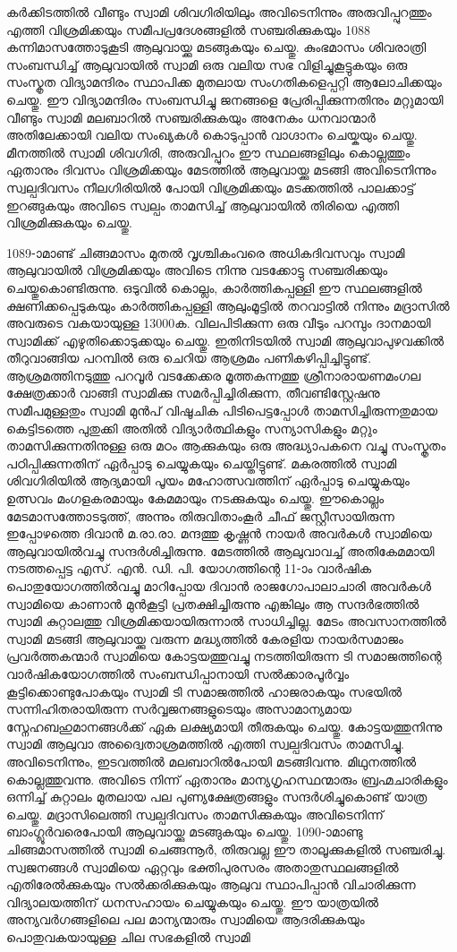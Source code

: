 \documentclass[12pt,openany]{book}
\begin{document}
	കർക്കിടത്തിൽ വീണ്ടും സ്വാമി ശിവഗിരിയിലും അവിടെനിന്നും അരുവിപ്പുറത്തും എത്തി വിശ്രമിക്കയും സമീപപ്രദേശങ്ങളിൽ സഞ്ചരിക്കുകയും 1088 കന്നിമാസത്തോടുകൂടി ആലുവായ്ക്കു മടങ്ങുകയും ചെയ്തു. കുംഭമാസം ശിവരാത്രി സംബന്ധിച്ച് ആലുവായിൽ സ്വാമി ഒരു വലിയ സഭ വിളിച്ചുകൂട്ടുകയും ഒരു സംസ്കൃത വിദ്യാമന്ദിരം സ്ഥാപിക്ക മുതലായ സംഗതികളെപ്പറ്റി ആലോചിക്കയും ചെയ്തു. ഈ വിദ്യാമന്ദിരം സംബന്ധിച്ചു ജനങ്ങളെ പ്രേരിപ്പിക്കുന്നതിനും മറ്റുമായി വീണ്ടും സ്വാമി മലബാറിൽ സഞ്ചരിക്കുകയും അനേകം ധനവാന്മാർ അതിലേക്കായി വലിയ സംഖ്യകൾ കൊടുപ്പാൻ വാഗ്ദാനം ചെയ്കയും ചെയ്തു. മീനത്തിൽ സ്വാമി ശിവഗിരി, അരുവിപ്പുറം ഈ സ്ഥലങ്ങളിലും കൊല്ലത്തും ഏതാനും ദിവസം വിശ്രമിക്കയും മേടത്തിൽ ആലുവായ്ക്കു മടങ്ങി അവിടെനിന്നും സ്വല്പദിവസം നീലഗിരിയിൽ പോയി വിശ്രമിക്കയും മടക്കത്തിൽ പാലക്കാട്ട് ഇറങ്ങുകയും അവിടെ സ്വല്പം താമസിച്ച് ആലുവായിൽ തിരിയെ എത്തി വിശ്രമിക്കുകയും ചെയ്തു.
	
	1089-ാമാണ്ട് ചിങ്ങമാസം മുതൽ വൃശ്ചികംവരെ അധികദിവസവും സ്വാമി ആലുവായിൽ വിശ്രമിക്കയും അവിടെ നിന്നു വടക്കോട്ടു സഞ്ചരിക്കയും ചെയ്തുകൊണ്ടിരുന്നു. ഒടുവിൽ കൊല്ലം, കാർത്തികപ്പള്ളി ഈ സ്ഥലങ്ങളിൽ ക്ഷണിക്കപ്പെടുകയും കാർത്തികപ്പള്ളി ആലുംമൂട്ടിൽ തറവാട്ടിൽ നിന്നും മദ്രാസിൽ അവരുടെ വകയായുള്ള 13000ക. വിലപിടിക്കുന്ന ഒരു വീടും പറമ്പും ദാനമായി സ്വാമിക്ക് എഴുതിക്കൊടുക്കയും ചെയ്തു. ഇതിനിടയിൽ സ്വാമി ആലുവാപുഴവക്കിൽ തീറുവാങ്ങിയ പറമ്പിൽ ഒരു ചെറിയ ആശ്രമം പണികഴിപ്പിച്ചിട്ടുണ്ട്. ആശ്രമത്തിനടുത്തു പറവൂർ വടക്കേക്കര മൂത്തകുന്നത്തു ശ്രീനാരായണമംഗല ക്ഷേത്രക്കാർ വാങ്ങി സ്വാമിക്കു സമർപ്പിച്ചിരിക്കുന്ന, തീവണ്ടിസ്റ്റേഷനു സമീപമുള്ളതും സ്വാമി മുൻപ് വിഷൂചിക പിടിപെട്ടപ്പോൾ താമസിച്ചിരുന്നതുമായ കെട്ടിടത്തെ പുതുക്കി അതിൽ വിദ്യാർത്ഥികളും സന്യാസികളും മറ്റും താമസിക്കുന്നതിനുള്ള ഒരു മഠം ആക്കുകയും ഒരു അദ്ധ്യാപകനെ വച്ചു സംസ്കൃതം പഠിപ്പിക്കുന്നതിന് ഏർപ്പാടു ചെയ്യുകയും ചെയ്തിട്ടുണ്ട്. മകരത്തിൽ സ്വാമി ശിവഗിരിയിൽ ആദ്യമായി പൂയം മഹോത്സവത്തിന് ഏർപ്പാടു ചെയ്യുകയും ഉത്സവം മംഗളകരമായും കേമമായും നടക്കുകയും ചെയ്തു. ഈകൊല്ലം മേടമാസത്തോടടുത്ത്, അന്നും തിരുവിതാംകൂർ ചീഫ് ജസ്റ്റീസായിരുന്ന ഇപ്പോഴത്തെ ദിവാൻ മ.രാ.രാ. മന്ദത്തു കൃഷ്ണൻ നായർ അവർകൾ സ്വാമിയെ ആലുവായിൽവച്ചു സന്ദർശിച്ചിരുന്നു. മേടത്തിൽ ആലുവാവച്ച് അതികേമമായി നടത്തപ്പെട്ട എസ്. എൻ. ഡി. പി. യോഗത്തിന്റെ 11-ാം വാർഷിക പൊതുയോഗത്തിൽവച്ചു മാറിപ്പോയ ദിവാൻ രാജഗോപാലാചാരി അവർകൾ സ്വാമിയെ കാണാൻ മുൻകൂട്ടി പ്രതക്ഷിച്ചിരുന്നു എങ്കിലും ആ സന്ദർഭത്തിൽ സ്വാമി കുറ്റാലത്തു വിശ്രമിക്കയായിരുന്നാൽ സാധിച്ചില്ല. മേടം അവസാനത്തിൽ സ്വാമി മടങ്ങി ആലുവായ്ക്കു വരുന്ന മദ്ധ്യത്തിൽ കേരളിയ നായർസമാജം പ്രവർത്തകന്മാർ സ്വാമിയെ കോട്ടയത്തുവച്ചു നടത്തിയിരുന്ന ടി സമാജത്തിന്റെ വാർഷികയോഗത്തിൽ സംബന്ധിപ്പാനായി സൽക്കാരപൂർവ്വം കൂട്ടിക്കൊണ്ടുപോകയും സ്വാമി ടി സമാജത്തിൽ ഹാജരാകയും സഭയിൽ സന്നിഹിതരായിരുന്ന സർവ്വജനങ്ങളുടെയും അസാമാന്യമായ സ്നേഹബഹുമാനങ്ങൾക്ക് ഏക ലക്ഷ്യമായി തീരുകയും ചെയ്തു. കോട്ടയത്തുനിന്നു സ്വാമി ആലുവാ അദ്വൈതാശ്രമത്തിൽ എത്തി സ്വല്പദിവസം താമസിച്ചു. അവിടെനിന്നും, ഇടവത്തിൽ മലബാറിൽപോയി മടങ്ങിവന്നു. മിഥുനത്തിൽ കൊല്ലത്തുവന്നു. അവിടെ നിന്ന് ഏതാനും മാന്യഗൃഹസ്ഥന്മാരും ബ്രഹ്മചാരികളും ഒന്നിച്ച് കുറ്റാലം മുതലായ പല പുണ്യക്ഷേത്രങ്ങളും സന്ദർശിച്ചുകൊണ്ട് യാത്ര ചെയ്തു. മദ്രാസിലെത്തി സ്വല്പദിവസം താമസിക്കുകയും അവിടെനിന്ന് ബാംഗ്ലൂർവരെപോയി ആലുവായ്ക്കു മടങ്ങുകയും ചെയ്തു. 1090-ാമാണ്ടു ചിങ്ങമാസത്തിൽ സ്വാമി ചെങ്ങന്നൂർ, തിരുവല്ല ഈ താലൂക്കുകളിൽ സഞ്ചരിച്ചു. സ്വജനങ്ങൾ സ്വാമിയെ ഏറ്റവും ഭക്തിപുരസരം അതാതുസ്ഥലങ്ങളിൽ എതിരേൽക്കുകയും സൽക്കരിക്കുകയും ആലുവ സ്ഥാപിപ്പാൻ വിചാരിക്കുന്ന വിദ്യാലയത്തിന് ധനസഹായം ചെയ്യുകയും ചെയ്തു. ഈ യാത്രയിൽ അന്യവർഗങ്ങളിലെ പല മാന്യന്മാരും സ്വാമിയെ ആദരിക്കുകയും പൊതുവകയായുള്ള ചില സഭകളിൽ സ്വാമി 
\end{document}
